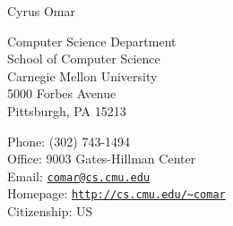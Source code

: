 \documentclass[10pt,letterpaper]{article}
\def\name{Cyrus Omar}
\renewenvironment{itemize}{
  \begin{list}{}{
    \setlength{\leftmargin}{1.5em}
    \setlength{\itemsep}{0.25em}
    \setlength{\parskip}{0pt}
    \setlength{\parsep}{0.25em}
  }
}{
  \end{list}
}
\begin{document}
{\huge \name}


\bigskip

\begin{minipage}[t]{0.495\textwidth}
  Computer Science Department \\
  School of Computer Science \\
  Carnegie Mellon University \\
  5000 Forbes Avenue \\
  Pittsburgh, PA 15213
\end{minipage}
\begin{minipage}[t]{0.495\textwidth}
  Phone: (302) 743-1494 \\
  Office: 9003 Gates-Hillman Center \\
  Email: \href{mailto:comar@cs.cmu.edu}{\texttt{comar@cs.cmu.edu}} \\
  Homepage: \href{http://cs.cmu.edu/~comar}{\texttt{http://cs.cmu.edu/\textasciitilde comar}} \\
  Citizenship: US
\end{minipage}


\end{document}
